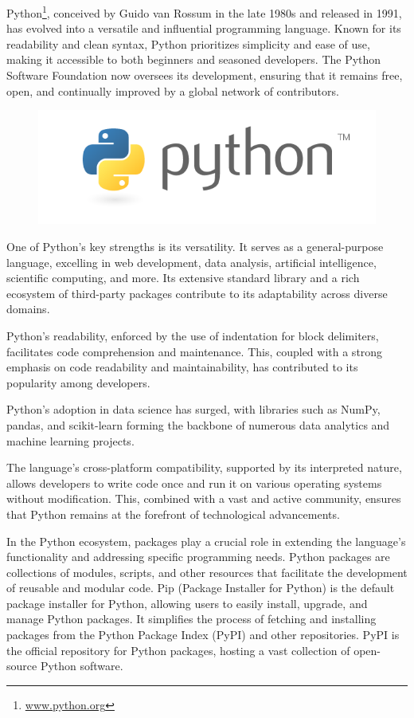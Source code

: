 Python\footnote{\url{www.python.org}}, conceived by Guido van Rossum in the late 1980s and released in 1991, has evolved into a versatile and influential programming language. Known for its readability and clean syntax, Python prioritizes simplicity and ease of use, making it accessible to both beginners and seasoned developers. The Python Software Foundation now oversees its development, ensuring that it remains free, open, and continually improved by a global network of contributors.

\begin{figure}
\begin{center}
\includegraphics[height=.5in]{python-logo.png}
\end{center}
\end{figure}

One of Python's key strengths is its versatility. It serves as a general-purpose language, excelling in web development, data analysis, artificial intelligence, scientific computing, and more. Its extensive standard library and a rich ecosystem of third-party packages contribute to its adaptability across diverse domains.

Python's readability, enforced by the use of indentation for block delimiters, facilitates code comprehension and maintenance. This, coupled with a strong emphasis on code readability and maintainability, has contributed to its popularity among developers.

Python's adoption in data science has surged, with libraries such as NumPy, pandas, and scikit-learn forming the backbone of numerous data analytics and machine learning projects.

The language's cross-platform compatibility, supported by its interpreted nature, allows developers to write code once and run it on various operating systems without modification. This, combined with a vast and active community, ensures that Python remains at the forefront of technological advancements.

In the Python ecosystem, packages play a crucial role in extending the language's functionality and addressing specific programming needs. Python packages are collections of modules, scripts, and other resources that facilitate the development of reusable and modular code. Pip (Package Installer for Python) is the default package installer for Python, allowing users to easily install, upgrade, and manage Python packages. It simplifies the process of fetching and installing packages from the Python Package Index (PyPI) and other repositories. PyPI is the official repository for Python packages, hosting a vast collection of open-source Python software.

